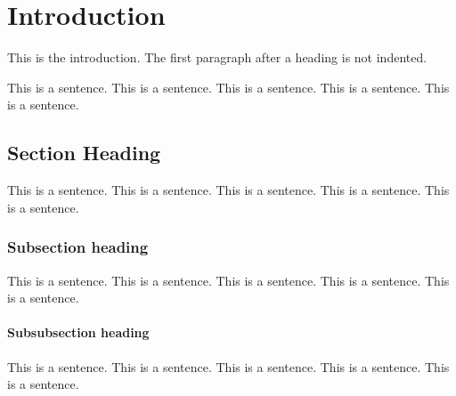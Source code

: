%
%
%


\chapter{Introduction}

This is the introduction.
The first paragraph after a heading is not indented.

This is a sentence.
This is a sentence.
This is a sentence.
This is a sentence.
This is a sentence.


\section{Section Heading}

This is a sentence.
This is a sentence.
This is a sentence.
This is a sentence.
This is a sentence.


\subsection{Subsection heading}

This is a sentence.
This is a sentence.
This is a sentence.
This is a sentence.
This is a sentence.


\subsubsection{Subsubsection heading}

This is a sentence.
This is a sentence.
This is a sentence.
This is a sentence.
This is a sentence.
